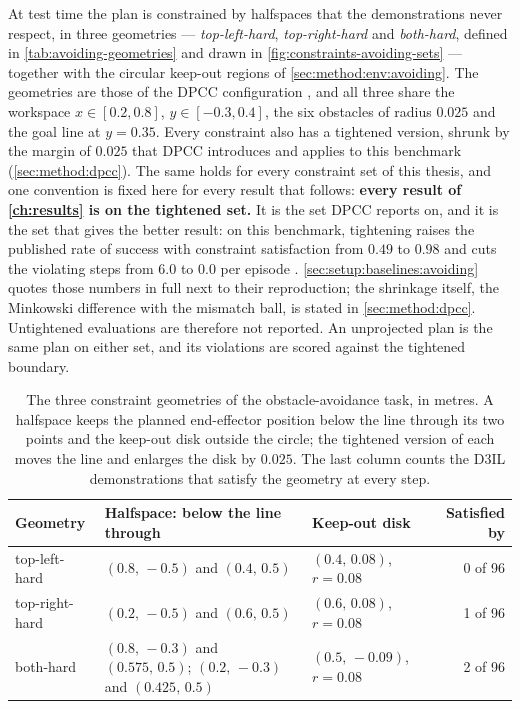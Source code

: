 At test time
the plan is constrained by halfspaces that the demonstrations never respect, in three geometries --- \emph{top-left-hard}, \emph{top-right-hard} and \emph{both-hard}, defined in \autoref{tab:avoiding-geometries} and drawn in \autoref{fig:constraints-avoiding-sets} --- together with the circular keep-out regions
of \autoref{sec:method:env:avoiding}. The geometries are those of the \ac{DPCC} configuration \parencite[Sec.~6.1]{romer2025diffusion}, and all three share the workspace $x\in[0.2,0.8]$, $y\in[-0.3,0.4]$, the six obstacles of radius $0.025$ and the goal line at $y=0.35$. Every
constraint also has a tightened version, shrunk by the margin of $0.025$ that \ac{DPCC} introduces and
applies to this benchmark \parencite[Sec.~5.3]{romer2025diffusion} (\autoref{sec:method:dpcc}). The same
holds for every constraint set of this thesis, and one convention is fixed here for every result that
follows: \textbf{every result of \autoref{ch:results} is on the tightened set.} It is the set \ac{DPCC}
reports on, and it is the set that gives the better result: on this benchmark, tightening raises the
published rate of success with constraint satisfaction from $0.49$ to $0.98$ and cuts the violating steps
from $6.0$ to $0.0$ per episode \parencite[Table~1]{romer2025diffusion}. \autoref{sec:setup:baselines:avoiding}
quotes those numbers in full next to their reproduction; the shrinkage itself, the Minkowski difference
with the mismatch ball, is stated in \autoref{sec:method:dpcc}. Untightened evaluations are therefore not
reported. An unprojected plan is the same plan on either set, and its
violations are scored against the tightened boundary.

\begin{table}[htpb]
  \caption[Constraint geometries of obstacle avoidance]{The three constraint geometries of the
  obstacle-avoidance task, in metres. A halfspace keeps the planned end-effector position below the line
  through its two points and the keep-out disk outside the circle; the tightened version of each moves
  the line and enlarges the disk by $0.025$. The last column counts the D3IL demonstrations that satisfy
  the geometry at every step.}
  \label{tab:avoiding-geometries}
  \centering
  \begin{tabularx}{\linewidth}{@{}l L l r@{}}
    \toprule
    Geometry & Halfspace: below the line through & Keep-out disk & Satisfied by \\
    \midrule
    top-left-hard  & $(0.8,\,-0.5)$ and $(0.4,\,0.5)$ & $(0.4,\,0.08)$, $r=0.08$ & 0 of 96 \\
    top-right-hard & $(0.2,\,-0.5)$ and $(0.6,\,0.5)$ & $(0.6,\,0.08)$, $r=0.08$ & 1 of 96 \\
    both-hard      & $(0.8,\,-0.3)$ and $(0.575,\,0.5)$; $(0.2,\,-0.3)$ and $(0.425,\,0.5)$ & $(0.5,\,-0.09)$, $r=0.08$ & 2 of 96 \\
    \bottomrule
  \end{tabularx}
\end{table}

